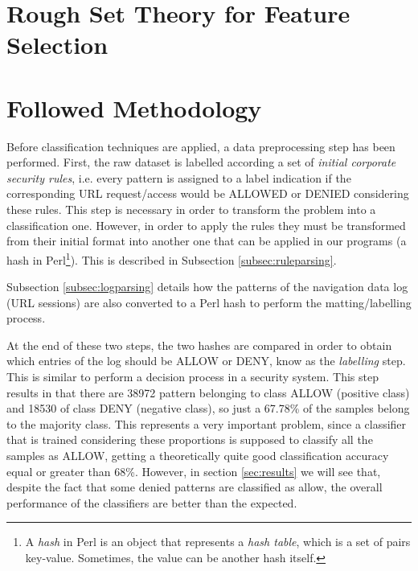 \documentclass{llncs}
\begin{document}
%
\section{Rough Set Theory for Feature Selection}
\label{sec:featureselection}

%
\section{Followed Methodology}
\label{sec:methodology}

\noindent Before classification techniques are applied, a data preprocessing step has been performed. First, the raw dataset is labelled according a set of \textit{initial corporate security rules}, i.e. every pattern is assigned to a label indication if the corresponding URL request/access would be ALLOWED or DENIED considering these rules. This step is necessary in order to transform the problem into a classification one. However, in order to apply the rules they must be transformed from their initial format into another one that can be applied in our programs (a hash in Perl\footnote{A \textit{hash} in Perl is an object that represents a \textit{hash table}, which is a set of pairs key-value. Sometimes, the value can be another hash itself.}). This is described in Subsection \ref{subsec:ruleparsing}. 

Subsection \ref{subsec:logparsing} details how the patterns of the navigation data log (URL sessions) are also converted to a Perl hash to perform the matting/labelling process. 

At the end of these two steps, the two hashes are compared in order to obtain which entries of the log should be ALLOW or DENY, know as the \textit{labelling} step. This is similar to perform a decision process in a security system. This step results in that there are 38972 pattern belonging to class ALLOW (positive class) and 18530 of class DENY (negative class), so just a 67.78\% of the samples belong to the majority class. This represents a very important problem, since a classifier that is trained considering these proportions is supposed to classify all the samples as ALLOW, getting a theoretically quite good classification accuracy equal or greater than 68\%. However, in section \ref{sec:results} we will see that, despite the fact that some denied patterns are classified as allow, the overall performance of the classifiers are better than the expected.
\end{document}
